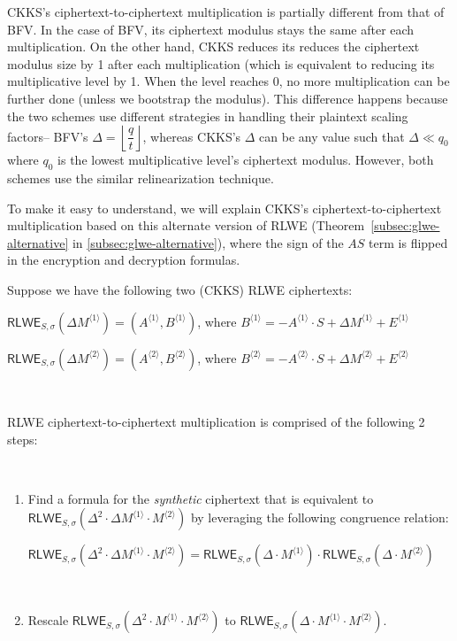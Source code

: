 CKKS's ciphertext-to-ciphertext multiplication is partially different from that of BFV. In the case of BFV, its ciphertext modulus stays the same after each multiplication. On the other hand, CKKS reduces its reduces the ciphertext modulus size by 1 after each multiplication (which is equivalent to reducing its multiplicative level by 1. When the level reaches 0, no more multiplication can be further done (unless we bootstrap the modulus). This difference happens because the two schemes use different strategies in handling their plaintext scaling factors-- BFV's $\Delta = \left\lfloor\dfrac{q}{t}\right\rfloor$, whereas CKKS's $\Delta$ can be any value such that $\Delta \ll q_0$ where $q_0$ is the lowest multiplicative level's ciphertext modulus. However, both schemes use the similar relinearization technique. 

To make it easy to understand, we will explain CKKS's ciphertext-to-ciphertext multiplication based on this alternate version of RLWE (Theorem~\ref*{subsec:glwe-alternative} in \autoref{subsec:glwe-alternative}),
where the sign of the $AS$ term is flipped in the encryption and decryption formulas.


Suppose we have the following two (CKKS) RLWE ciphertexts:

$\textsf{RLWE}_{S, \sigma}(\Delta M^{\langle 1 \rangle}) = (A^{\langle 1 \rangle}, B^{\langle 1 \rangle})$, \text{ } where $B^{\langle 1 \rangle} = -A^{\langle 1 \rangle} \cdot S + \Delta M^{\langle 1 \rangle} + E^{\langle 1 \rangle}$

$\textsf{RLWE}_{S, \sigma}(\Delta M^{\langle 2 \rangle}) = (A^{\langle 2 \rangle}, B^{\langle 2 \rangle})$, \text{ } where $B^{\langle 2 \rangle} = -A^{\langle 2 \rangle} \cdot S + \Delta M^{\langle 2 \rangle} + E^{\langle 2 \rangle}$

$ $

\noindent RLWE ciphertext-to-ciphertext multiplication is comprised of the following 2 steps:


$ $

\begin{enumerate}
\item Find a formula for the \textit{synthetic} ciphertext that is equivalent to $\textsf{RLWE}_{S, \sigma}(\Delta^2 \cdot \Delta M^{\langle 1 \rangle} \cdot M^{\langle 2 \rangle})$ by leveraging the following congruence relation: 

$\textsf{RLWE}_{S, \sigma}(\Delta^2 \cdot \Delta M^{\langle 1 \rangle} \cdot M^{\langle 2 \rangle}) = \textsf{RLWE}_{S, \sigma}(\Delta \cdot M^{\langle 1 \rangle}) \cdot \textsf{RLWE}_{S, \sigma}(\Delta \cdot M^{\langle 2 \rangle})$ 

$ $

\item Rescale $\textsf{RLWE}_{S, \sigma}(\Delta^2 \cdot M^{\langle 1 \rangle} \cdot M^{\langle 2 \rangle})$ to $\textsf{RLWE}_{S, \sigma}(\Delta \cdot M^{\langle 1 \rangle} \cdot M^{\langle 2 \rangle})$.
\end{enumerate}

